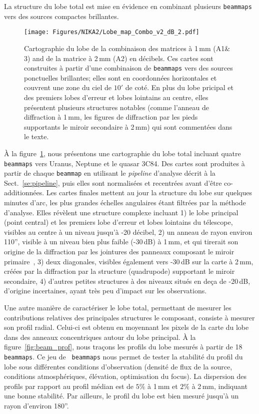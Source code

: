 La structure du lobe total est mise en évidence en combinant plusieurs
{\tt beammaps} vers des sources compactes brillantes.
\begin{figure}[!thbp]
\begin{center}
  \texttt{[image: Figures/NIKA2/Lobe\_map\_Combo\_v2\_dB\_2.pdf]}
\caption[Noticeable features of NIKA2 beam pattern.]{Cartographie du
  lobe de la combinaison des matrices à 1\,mm (A1$\&$3) and de la
  matrice à 2\,mm (A2) en décibels. Ces cartes sont construites à
  partir d'une combinaison de {\tt beammaps} vers des sources
  ponctuelles brillantes; elles sont en coordonnées horizontales et
  couvrent une zone du ciel de $10'$ de coté. En plus du lobe pricipal
  et des premiers lobes d'erreur et lobes lointains au centre, elles
  présentent plusieurs structures notables (comme l'anneau de
  diffraction à 1\,mm, les figures de diffraction par les pieds
  supportants le miroir secondaire à 2\,mm) qui sont commentées dans le
  texte.}
\label{fig:features}
\end{center}
\end{figure}
\`A la figure~\ref{fig:features}, nous présentons une cartographie du lobe
total incluant quatre {\tt beammaps} vers Uranus, Neptune et le quasar
3C84. Des cartes sont produites à partir de chaque {\tt beammap} en
utilisant le \emph{pipeline} d'analyse décrit à la
Sect.~\ref{se:pipeline}, puis elles sont normalisées et recentrées avant d'être
co-additionnées. Les cartes finales mettent au jour la structure du
lobe sur quelques minutes d'arc, les plus grandes échelles angulaires
étant filtrées par la méthode d'analyse. Elles révèlent une structure
complexe incluant 1) le lobe principal (point central) et les premiers
lobe d'erreur et lobes lointains du télescope, visibles au centre à un
niveau jusqu'à -20 décibel, 2) un anneau de rayon environ 110'',
visible à un niveau bien plus faible (-30\,dB) à 1\,mm, et qui
tirerait son origine de la diffraction par les jointures des panneaux
composant le miroir primaire~\citep{Greve2010}, 3) deux diagonales,
visibles également vers -30\,dB sur la carte à 2\,mm, créées par la
diffraction par la structure (quadrupode) supportant le miroir
secondaire, 4) d'autres petites structures à des niveaux situés en
deça de -20\,dB, d'origine incertaines, ayant très peu d'impact sur
les observations.


Une autre manière de caractériser le lobe total, permettant de mesurer
les contributions relatives des principales structures le composant,
consiste à mesurer son profil radial. Celui-ci est obtenu en moyennant
les pixels de la carte du lobe dans des anneaux concentriques autour
du lobe principal. \`A la figure~\ref{fig:beam_prof}, nous traçons les
profils du lobe mesurés à partir de 18 {\tt beammaps}. Ce jeu de {\tt
  beammaps} nous permet de tester la stabilité du profil du lobe sous
différentes conditions d'observation (densité de flux de la source,
conditions atmosphériques, élévation, optimisation du focus). La
dispersion des profils par rapport au profil médian est de $5\%$ à
1\,mm et $2\%$ à 2\,mm, indiquant une bonne stabilité. Par ailleurs,
le profil du lobe est bien mesuré jusqu'à un rayon d'environ
180''.

